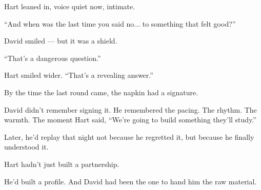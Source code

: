 Hart leaned in, voice quiet now, intimate.

“And when was the last time you said no... to something that felt good?”

David smiled — but it was a shield.

“That’s a dangerous question.”

Hart smiled wider. “That’s a revealing answer.”

By the time the last round came, the napkin had a signature.

David didn’t remember signing it.  
He remembered the pacing. The rhythm. The warmth.  
The moment Hart said, “We’re going to build something they’ll study.”

Later, he’d replay that night not because he regretted it, but because he finally understood it.

Hart hadn’t just built a partnership.

He’d built a profile.  
And David had been the one to hand him the raw material.


\medskip

